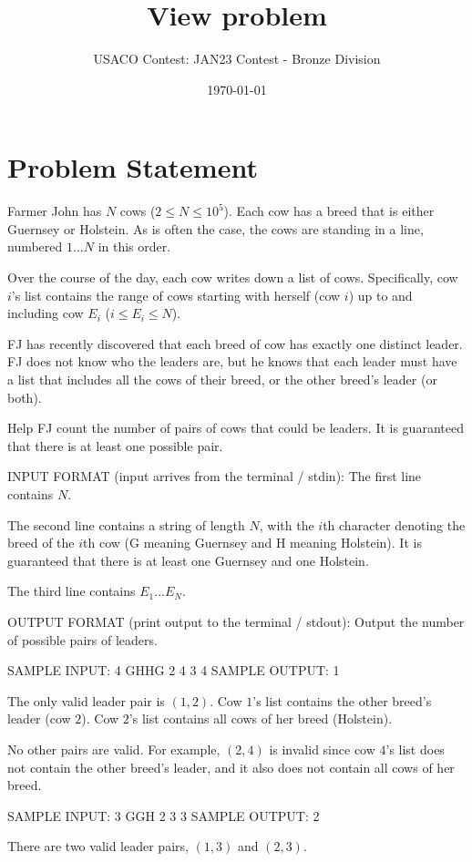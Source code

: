 \documentclass[12pt]{article}
\title{View problem}
\author{USACO Contest: JAN23 Contest - Bronze Division}
\date{\today}
\begin{document}
\maketitle

\section*{Problem Statement}


Farmer John has $N$ cows ($2 \leq N \leq 10^5$). Each cow has a breed that is
either Guernsey or Holstein.  As is often the case, the cows are standing in a
line, numbered $1 \ldots N$ in this order.  

Over the course of the day, each cow writes down a list of cows.  Specifically,
cow $i$'s list contains the range of cows starting with herself (cow $i$) up to
and including cow $E_i$ ($i \leq E_i \leq N$).

FJ has recently discovered that each breed of cow has exactly one distinct
leader. FJ does not know who the leaders are, but he knows that each leader must
have a list that includes all the cows of their breed, or the other breed's 
leader (or both).

Help FJ count the number of pairs of cows that could be leaders. It is
guaranteed that there is at least one possible pair.

INPUT FORMAT (input arrives from the terminal / stdin):
The first line contains $N$.

The second line contains a string of length $N$, with the $i$th character
denoting the breed of the $i$th cow (G meaning Guernsey and H meaning Holstein).
It is guaranteed that there is at least one Guernsey and one Holstein.

The third line contains $E_1 \dots E_N$.

OUTPUT FORMAT (print output to the terminal / stdout):
Output the number of possible pairs of leaders.

SAMPLE INPUT:
4
GHHG
2 4 3 4
SAMPLE OUTPUT: 
1

The only valid leader pair is $(1, 2)$. Cow $1$'s list contains the other
breed's leader (cow $2$). Cow $2$'s list contains all cows of her breed
(Holstein). 

No other pairs are valid. For example, $(2,4)$ is invalid since cow $4$'s list
does not contain the other breed's leader, and it also does not contain all cows
of her breed.

SAMPLE INPUT:
3
GGH
2 3 3
SAMPLE OUTPUT: 
2

There are two valid leader pairs, $(1, 3)$ and $(2, 3)$.
\end{document}
